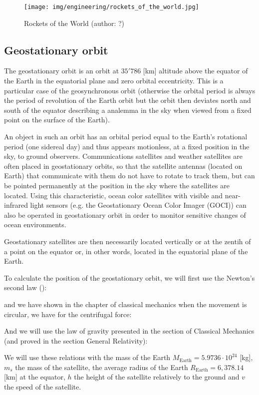 	\begin{figure}[H]
		\centering
		\texttt{[image: img/engineering/rockets\_of\_the\_world.jpg]}
		\caption[Rockets of the World]{Rockets of the World (author: ?)}
	\end{figure}
	
	\subsection{Geostationary orbit}
	The geostationary orbit is an orbit at $35'786$ [km] altitude above the equator of the Earth in the equatorial plane and zero orbital eccentricity. This is a particular case of the geosynchronous orbit (otherwise the orbital period is always the period of revolution of the Earth orbit but the orbit then deviates north and south of the equator describing a analemma in the sky when viewed from a fixed point on the surface of the Earth).
	
	An object in such an orbit has an orbital period equal to the Earth's rotational period (one sidereal day) and thus appears motionless, at a fixed position in the sky, to ground observers. Communications satellites and weather satellites are often placed in geostationary orbits, so that the satellite antennas (located on Earth) that communicate with them do not have to rotate to track them, but can be pointed permanently at the position in the sky where the satellites are located. Using this characteristic, ocean color satellites with visible and near-infrared light sensors (e.g. the Geostationary Ocean Color Imager (GOCI)) can also be operated in geostationary orbit in order to monitor sensitive changes of ocean environments.
	
	Geostationary satellites are then necessarily located vertically or at the zentih of a point on the equator or, in other words, located in the equatorial plane of the Earth.
	
	To calculate the position of the geostationary orbit, we will first use the Newton's second law ():
	
	and we have shown in the chapter of classical mechanics when the movement is circular, we have for the centrifugal force:
	
	And we will use the law of gravity presented in the section of Classical Mechanics (and proved in the section General Relativity):
	
	We will use these relations with the mass of the Earth $M_\text{Earth}=5.9736\cdot 10^{24}$ [kg], $m_s$ the mass of the satellite, the average radius of the Earth $R_\text{Earth}=6,378.14$ [km] at the equator, $h$ the height of the satellite relatively to the ground and $v$ the speed of the satellite.
	
